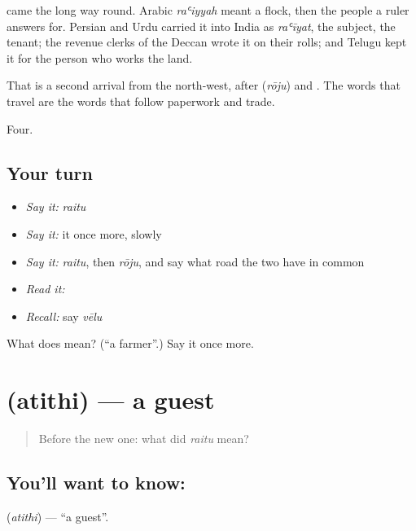  came the long way round. Arabic \emph{raʿiyyah} meant a flock, then the people a ruler answers for. Persian and Urdu carried it into India as \emph{raʿīyat}, the subject, the tenant; the revenue clerks of the Deccan wrote it on their rolls; and Telugu kept it for the person who works the land.

That is a second arrival from the north-west, after  (\emph{rōju}) and . The words that travel are the words that follow paperwork and trade.

\begin{grammarlens}[title={What you've built}]
Four.
\end{grammarlens}

\subsection*{Your turn}
\begin{itemize}
\raggedright
  \item \emph{Say it:} \emph{raitu}
  \item \emph{Say it:} it once more, slowly
  \item \emph{Say it:} \emph{raitu}, then \emph{rōju}, and say what road the two have in common
  \item \emph{Read it:} \textbf{}
  \item \emph{Recall:} say \emph{vēlu}
\end{itemize}

\begin{tcolorbox}[breakable,colback=teal!4,colframe=teal!35!black,title={Before you move on}]
What does  mean? (\textquotedblleft{}a farmer\textquotedblright{}.) Say it once more.
\end{tcolorbox}
\section[\texorpdfstring{\te{అతిథి} (atithi)}{అతిథి (atithi)}]{ (atithi) — a guest}

\label{lesson:TE-C48-guest}



\begin{quote}
Before the new one: what did \emph{raitu} mean?
\end{quote}

\subsection*{You'll want to know: }
\textbf{} (\emph{atithi}) — \textquotedblleft{}a guest\textquotedblright{}.

